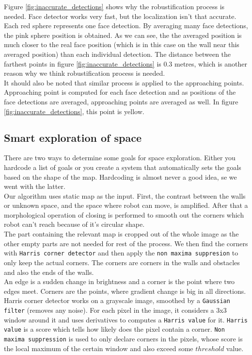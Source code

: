 \documentclass[12pt,a4paper]{article}
\begin{document}
	Figure \ref{fig:inaccurate_detections} shows why the robustification process is needed. Face detector works very fast, but the localization isn't that accurate. Each red sphere represents one face detection. By averaging many face detections, the pink sphere position is obtained. As we can see, the the averaged position is much closer to the real face position (which is in this case on the wall near this averaged position) than each individual detection. The distance between the farthest points in figure \ref{fig:inaccurate_detections} is 0.3 metres, which is another reason why we think robustification process is needed. \\
	
	It should also be noted that similar process is applied to the approaching points. Approaching point is computed for each face detection and as positions of the face detections are averaged, approaching points are averaged as well. In figure \ref{fig:inaccurate_detections}, this point is yellow. \\
		
	\subsection{Smart exploration of space} \label{smart_exploration}
	There are two ways to determine some goals for space exploration. Either you hardcode a list of goals or you create a system that automatically sets the goals based on the shape of the map. Hardcoding is almost never a good idea, se we went with the latter. \\

	Our algorithm uses static map as the input. First, the contrast between the walls or unknown space, and the space where robot can move, is amplified. After that a morphological operation of closing is performed to smooth out the corners which robot can't reach because of it's circular shape. \\
	
	The part containing the relevant map is cropped out of the whole image as the other empty parts are not needed for rest of the process. We then find the corners with \texttt{Harris corner detector} and then apply the \texttt{non maxima suppresion} to only keep the actual corners. The corners are corners in the walls and obstacles and also the ends of the walls. \\
	
	An edge is a sudden change in brightness and a corner is the point where two edges meet. Corners are the points, where gradient change is big in all directions. Harris corner detector works on a grayscale image, smoothed by a \texttt{Gaussian filter} (removes any noise). For each pixel in the image, it considers a 3x3 window around it and uses derivatives to computes a \texttt{Harris value} for it. \texttt{Harris value} is a score which tells how likely does the pixel contain a corner. \texttt{Non maxima suppression} is used to only declare corners in the pixels, whose score is the local maximum of the certain window and also exceed some $threshold$ value. \\
\end{document}
